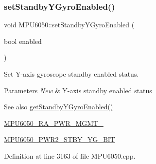 \begin{DoxyCode}{0}

\end{DoxyCode}
\mbox{\label{classMPU6050_ab0973d64b7132188539b07991f7ea1f0}} 
\subsubsection{\texorpdfstring{setStandbyYGyroEnabled()}{setStandbyYGyroEnabled()}}
{\footnotesize\ttfamily void M\+P\+U6050\+::set\+Standby\+Y\+Gyro\+Enabled (\begin{DoxyParamCaption}\item[{bool}]{enabled }\end{DoxyParamCaption})}

Set Y-\/axis gyroscope standby enabled status. 
\begin{DoxyParams}{Parameters}
{\em New} & Y-\/axis standby enabled status \\
\hline
\end{DoxyParams}
\begin{DoxySeeAlso}{See also}
\mbox{\hyperlink{classMPU6050_aaad2985f8d22aec123f1e1dabcdd427a}{get\+Standby\+Y\+Gyro\+Enabled()}} 

\mbox{\hyperlink{MPU6050_8h_aace6ce286da4d5f8c8f5ba6f80688e13}{M\+P\+U6050\+\_\+\+R\+A\+\_\+\+P\+W\+R\+\_\+\+M\+G\+M\+T\+\_}} 

\mbox{\hyperlink{MPU6050_8h_a81afc3f43cd9caf0739a3d3432718506}{M\+P\+U6050\+\_\+\+P\+W\+R2\+\_\+\+S\+T\+B\+Y\+\_\+\+Y\+G\+\_\+\+B\+IT}} 
\end{DoxySeeAlso}


Definition at line 3163 of file M\+P\+U6050.\+cpp.


